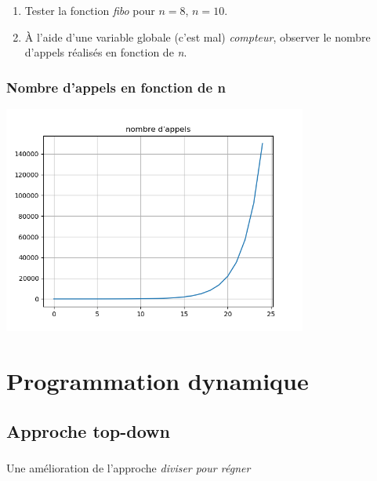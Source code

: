 \documentclass[svgnames,11pt]{beamer}
\begin{document}
\begin{frame}
    \frametitle{}

    \begin{activite}
        \begin{enumerate}
            \item Tester la fonction \emph{fibo} pour $n=8$, $n=10$.
            \item À l'aide d'une variable globale (c'est mal) \emph{compteur}, observer le nombre d'appels réalisés en fonction de \emph{n}.
        \end{enumerate}
    \end{activite}

\end{frame}

\begin{frame}
    \frametitle{}
    

\end{frame}
\begin{frame}
    \frametitle{Nombre d'appels en fonction de n}
    \begin{center}
        \centering
        \includegraphics[width=10cm]{ressources/nb-appels.png}
        \label{IMG}
    \end{center}
\end{frame}

\section{Programmation dynamique}
\subsection{Approche top-down}
\begin{frame}
    \frametitle{}

    Une amélioration de l'approche \emph{diviser pour régner}

\end{frame}
\begin{frame}
    \frametitle{}

    

\end{frame}
\end{document}
